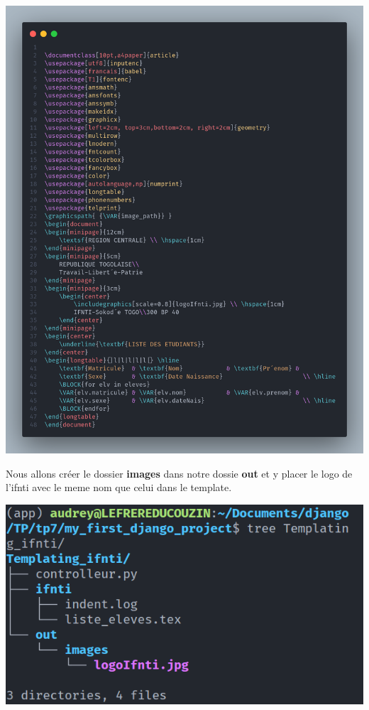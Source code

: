 \documentclass[11pt,a4paper]{article}
\begin{document}
\begin{enumerate}
\begin{center}
		\includegraphics[scale=0.2]{images/tex.png}
	\end{center} Nous allons créer le dossier \textbf{images} dans notre dossie \textbf{out} et y placer le logo de l'ifnti avec le meme nom que celui dans le template.
	\begin{center}
		\includegraphics[scale=0.5]{images/arch.png}
	\end{center}
\end{enumerate}
\end{document}
